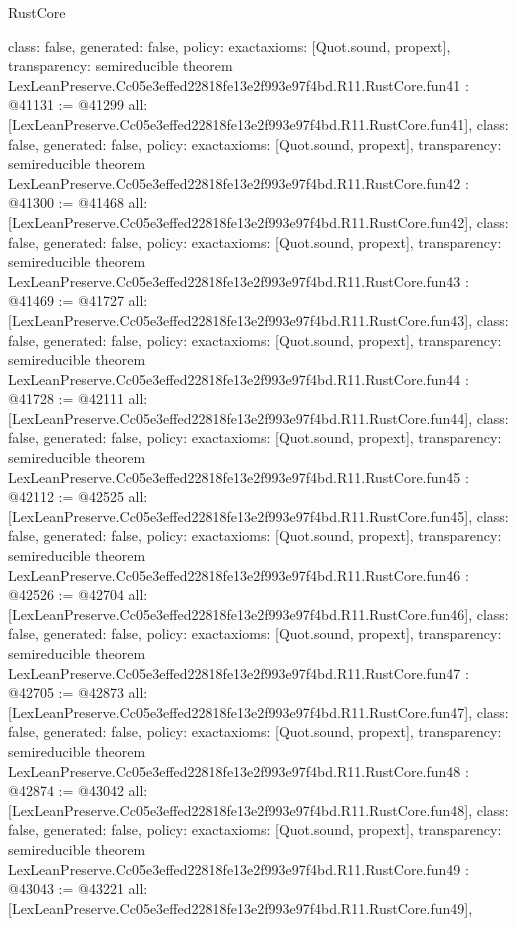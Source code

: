 \begin{lexlean}{RustCore}
\begin{coremodule}
{  class: false,
  generated: false,
  policy: exact{axioms: [Quot.sound, propext]},
  transparency: semireducible
}
theorem LexLeanPreserve.Cc05e3effed22818fe13e2f993e97f4bd.R11.RustCore.fun41 : @41131 := @41299 {
  all: [LexLeanPreserve.Cc05e3effed22818fe13e2f993e97f4bd.R11.RustCore.fun41],
  class: false,
  generated: false,
  policy: exact{axioms: [Quot.sound, propext]},
  transparency: semireducible
}
theorem LexLeanPreserve.Cc05e3effed22818fe13e2f993e97f4bd.R11.RustCore.fun42 : @41300 := @41468 {
  all: [LexLeanPreserve.Cc05e3effed22818fe13e2f993e97f4bd.R11.RustCore.fun42],
  class: false,
  generated: false,
  policy: exact{axioms: [Quot.sound, propext]},
  transparency: semireducible
}
theorem LexLeanPreserve.Cc05e3effed22818fe13e2f993e97f4bd.R11.RustCore.fun43 : @41469 := @41727 {
  all: [LexLeanPreserve.Cc05e3effed22818fe13e2f993e97f4bd.R11.RustCore.fun43],
  class: false,
  generated: false,
  policy: exact{axioms: [Quot.sound, propext]},
  transparency: semireducible
}
theorem LexLeanPreserve.Cc05e3effed22818fe13e2f993e97f4bd.R11.RustCore.fun44 : @41728 := @42111 {
  all: [LexLeanPreserve.Cc05e3effed22818fe13e2f993e97f4bd.R11.RustCore.fun44],
  class: false,
  generated: false,
  policy: exact{axioms: [Quot.sound, propext]},
  transparency: semireducible
}
theorem LexLeanPreserve.Cc05e3effed22818fe13e2f993e97f4bd.R11.RustCore.fun45 : @42112 := @42525 {
  all: [LexLeanPreserve.Cc05e3effed22818fe13e2f993e97f4bd.R11.RustCore.fun45],
  class: false,
  generated: false,
  policy: exact{axioms: [Quot.sound, propext]},
  transparency: semireducible
}
theorem LexLeanPreserve.Cc05e3effed22818fe13e2f993e97f4bd.R11.RustCore.fun46 : @42526 := @42704 {
  all: [LexLeanPreserve.Cc05e3effed22818fe13e2f993e97f4bd.R11.RustCore.fun46],
  class: false,
  generated: false,
  policy: exact{axioms: [Quot.sound, propext]},
  transparency: semireducible
}
theorem LexLeanPreserve.Cc05e3effed22818fe13e2f993e97f4bd.R11.RustCore.fun47 : @42705 := @42873 {
  all: [LexLeanPreserve.Cc05e3effed22818fe13e2f993e97f4bd.R11.RustCore.fun47],
  class: false,
  generated: false,
  policy: exact{axioms: [Quot.sound, propext]},
  transparency: semireducible
}
theorem LexLeanPreserve.Cc05e3effed22818fe13e2f993e97f4bd.R11.RustCore.fun48 : @42874 := @43042 {
  all: [LexLeanPreserve.Cc05e3effed22818fe13e2f993e97f4bd.R11.RustCore.fun48],
  class: false,
  generated: false,
  policy: exact{axioms: [Quot.sound, propext]},
  transparency: semireducible
}
theorem LexLeanPreserve.Cc05e3effed22818fe13e2f993e97f4bd.R11.RustCore.fun49 : @43043 := @43221 {
  all: [LexLeanPreserve.Cc05e3effed22818fe13e2f993e97f4bd.R11.RustCore.fun49],
}
\end{coremodule}
\end{lexlean}
